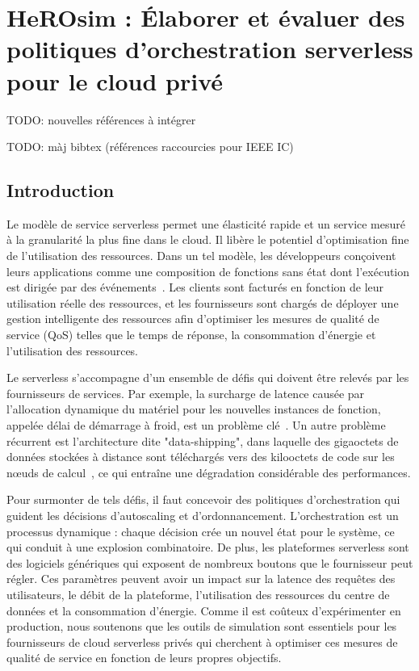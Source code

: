 \chapter{HeROsim : Élaborer et évaluer des politiques d'orchestration serverless pour le cloud privé}

TODO: nouvelles références à intégrer~\cite{bambrikSurveyCloudComputing2020, byrneReviewCloudComputing2017}

TODO: màj bibtex (références raccourcies pour IEEE IC)

\section{Introduction}
\label{section:herosim-introduction}

Le modèle de service serverless permet une élasticité rapide et un service mesuré à la granularité la plus fine dans le cloud. Il libère le potentiel d'optimisation fine de l'utilisation des ressources. Dans un tel modèle, les développeurs conçoivent leurs applications comme une composition de fonctions sans état dont l'exécution est dirigée par des événements~\cite{SchleierSmith2021WhatSC}. 
Les clients sont facturés en fonction de leur utilisation réelle des ressources, et les fournisseurs sont chargés de déployer une gestion intelligente des ressources afin d'optimiser les mesures de qualité de service (QoS) telles que le temps de réponse, la consommation d'énergie et l'utilisation des ressources.

Le serverless s'accompagne d'un ensemble de défis qui doivent être relevés par les fournisseurs de services. Par exemple, la surcharge de latence causée par l'allocation dynamique du matériel pour les nouvelles instances de fonction, appelée délai de démarrage à froid, est un problème clé~\cite{Lannurien2023}. Un autre problème récurrent est l'architecture dite "data-shipping", dans laquelle des gigaoctets de données stockées à distance sont téléchargés vers des kilooctets de code sur les nœuds de calcul~\cite{yuFollowingDataNot}, ce qui entraîne une dégradation considérable des performances.

Pour surmonter de tels défis, il faut concevoir des politiques d'orchestration qui guident les décisions d'autoscaling et d'ordonnancement.
L'orchestration est un processus dynamique : chaque décision crée un nouvel état pour le système, ce qui conduit à une explosion combinatoire. De plus, les plateformes serverless sont des logiciels génériques qui exposent de nombreux boutons que le fournisseur peut régler. Ces paramètres peuvent avoir un impact sur la latence des requêtes des utilisateurs, le débit de la plateforme, l'utilisation des ressources du centre de données et la consommation d'énergie. Comme il est coûteux d'expérimenter en production, nous soutenons que les outils de simulation sont essentiels pour les fournisseurs de cloud serverless privés qui cherchent à optimiser ces mesures de qualité de service en fonction de leurs propres objectifs.

